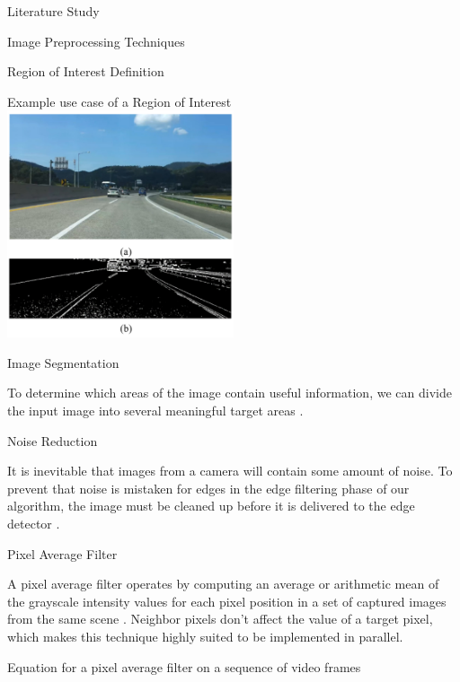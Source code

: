 \documentclass{matthijs}
\begin{document}
\begin{hoofdstuk}{Literature Study}
\begin{paragraaf}{Image Preprocessing Techniques}
\begin{subparagraaf}{Region of Interest Definition}
				\begin{figuur}{Example use case of a Region of Interest}
					\includegraphics[width=0.5\textwidth]{malmir2019design-img1.png}
					\cite{malmir2019design}
				\end{figuur}

			\end{subparagraaf}

			\begin{subparagraaf}{Image Segmentation}

				To determine which areas of the image contain useful information, we can divide the input image into several meaningful target areas \cite{shan2018image}.


			\end{subparagraaf}

			\begin{subparagraaf}{Noise Reduction}

				It is inevitable that images from a camera will contain some amount of noise.
				To prevent that noise is mistaken for edges in the edge filtering phase of our algorithm, the image must be cleaned up before it is delivered to the edge detector \cite{sarab2020canny}.

				\begin{subsubparagraaf}{Pixel Average Filter}

					A pixel average filter operates by computing an average or arithmetic mean of the grayscale intensity values for each pixel position in a set of captured images from the same scene \cite{spring2001image}.
					Neighbor pixels don't affect the value of a target pixel, which makes this technique highly suited to be implemented in parallel.
					
					\begin{figuur}{Equation for a pixel average filter on a sequence of video frames}


\end{figuur}
\end{subsubparagraaf}
\end{subparagraaf}
\end{paragraaf}
\end{hoofdstuk}
\end{document}
